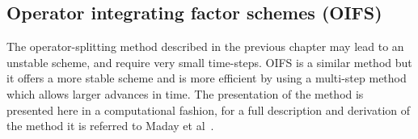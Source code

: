 



\subsection{Operator integrating factor schemes (OIFS)}\label{OIFS}
The operator-splitting method described in the previous chapter may lead to an unstable scheme, 
and require very small time-steps.
OIFS is a similar method but it offers a more stable scheme and is more efficient by using a multi-step method which allows 
larger advances in time. The presentation of the method is presented here in a computational fashion,
for a full description and derivation of the method it is referred to Maday et al~\cite{raey}.

